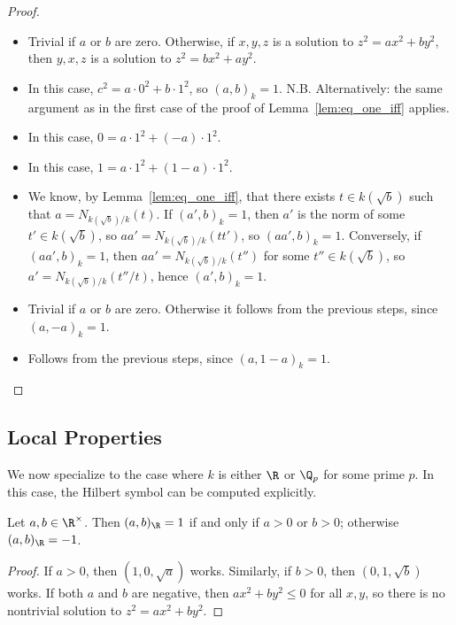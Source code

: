 \begin{proof}

	\begin{itemize}
		\item Trivial if $a$ or $b$ are zero. Otherwise, if $x,y,z$ is a solution to $z^2 = ax^2 + by^2$, then $y,x,z$ is a solution to
	$z^2 = bx^2 + ay^2$.
		\item In this case, $c^2 = a \cdot 0^2 + b \cdot 1^2$, so $(a,b)_k=1$.
		N.B. Alternatively: the same argument as in the first case of the proof of Lemma~\ref{lem:eq_one_iff} applies.
		\item In this case, $0 = a \cdot 1^2 + (-a) \cdot 1^2$.
		\item In this case, $1 = a \cdot 1^2 + (1 - a) \cdot 1^2$.
		\item We know, by Lemma~\ref{lem:eq_one_iff}, that there exists $t \in k(\sqrt{b})$ such that
		$a = N_{k(\sqrt{b})/k}(t)$. If $(a',b)_k=1$, then $a'$ is the norm of some $t' \in k(\sqrt{b})$,
		so $aa' = N_{k(\sqrt{b})/k}(t t')$, so $(aa', b)_k = 1$. Conversely, if $(aa', b)_k = 1$, then
		$aa' = N_{k(\sqrt{b})/k}(t'')$ for some $t'' \in k(\sqrt{b})$, so
		$a' = N_{k(\sqrt{b})/k}(t''/t)$, hence $(a', b)_k = 1$.
		\item Trivial if $a$ or $b$ are zero. Otherwise it follows from the previous steps, since $(a, -a)_k = 1$.
		\item Follows from the previous steps, since $(a, 1 - a)_k = 1$.
	\end{itemize}
\end{proof}
\subsection{Local Properties}
We now specialize to the case where $k$ is either $\R$ or $\Q_p$ for some prime $p$. In this case, the Hilbert symbol can be computed explicitly.

\begin{theorem}
	\label{thm:real}
	\leanok
	Let $a, b \in \R^\times$. Then $(a, b)_{\R} = 1$ if and only if $a > 0$ or $b > 0$; otherwise $(a, b)_{\R} = -1$.
\end{theorem}

\begin{proof}
	If $a>0$, then $(1,0,\sqrt{a})$ works. Similarly, if $b>0$, then $(0,1,\sqrt{b})$ works.
	If both $a$ and $b$ are negative, then $ax^2 + by^2 \le 0$ for all $x,y$, so there is no
	nontrivial solution to $z^2 = ax^2 + by^2$.
\end{proof}

